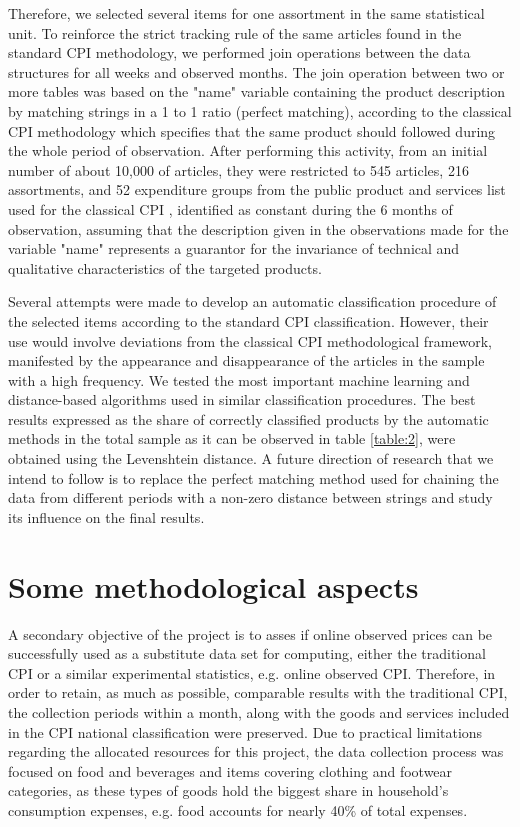 \documentclass[]{article}
\begin{document}
Therefore, we selected several items for one assortment in the same statistical unit. To reinforce the strict tracking 
rule of the same articles found in the standard CPI methodology, we performed join operations between the data structures 
for all weeks and observed months. The join operation between two or more tables was based on the "name" variable containing 
the product description by matching strings in a 1 to 1 ratio (perfect matching), according to the classical CPI methodology which specifies that the same product should followed during the whole period of observation. 
After performing this activity, from an initial number 
of about 10,000 of articles, they were restricted to 545 articles, 216 assortments, and 52 expenditure groups from the public product and services list used for the classical CPI \cite{cpi}, 
identified as constant during the 6 months of observation, assuming that the description given in the observations 
made for the variable "name" represents a guarantor for the invariance of technical and qualitative characteristics of the targeted products.



Several attempts were made to develop an automatic classification procedure of the selected items according to the standard CPI classification. 
However, their use would involve deviations from the classical CPI methodological framework, manifested by the appearance and disappearance 
of the articles in the sample with a high frequency. We tested the most important machine learning and distance-based algorithms 
used in similar classification procedures. The best results expressed as the share of correctly classified products by the automatic methods in the total sample as it can be observed in table \ref{table:2}, were obtained using the Levenshtein distance.
A future direction of research that we intend to follow is to replace the perfect matching method used for chaining the data from different periods with a non-zero distance between strings and study its influence on the final results. 


\section{Some methodological aspects}\label{methodology}

A secondary objective of the project is to asses if online observed prices can be successfully
used as a substitute data set for computing, either the traditional CPI or a similar 
experimental statistics, e.g. online observed CPI. Therefore, in order to retain, 
as much as possible, comparable results with the traditional CPI, the collection periods 
within a month, along with the goods and services included in the CPI national classification 
were preserved. Due to practical limitations regarding the allocated resources for 
this project, the data collection process was focused on food and beverages and items 
covering clothing and footwear categories, as these types of goods hold the biggest share in 
household's consumption expenses, e.g. food accounts for nearly 40\% of total expenses\cite{hhs}. 
\end{document}
